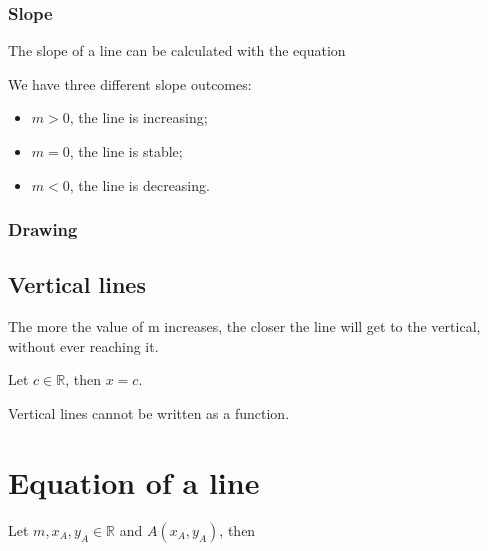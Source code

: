 \documentclass{article}
\newcommand{\figbox}[1]{ 
    \begin{figure*}[ht!]        
        \begin{center}            
            \fbox{#1}        
        \end{center}    
    \end{figure*}
}
\begin{document}
\subsubsection{Slope}
The slope of a line can be calculated with the equation
\figbox{$m=\frac{y_B - y_A}{x_B - x_A} = \frac{\Delta y}{\Delta x}$}

We have three different slope outcomes:
\begin{itemize}
    \item $m>0$, the line is increasing;
    \item $m=0$, the line is stable;
    \item $m<0$, the line is decreasing. 
\end{itemize}

\newpage
\subsubsection{Drawing}
\begin{center}
\end{center}

\subsection{Vertical lines}
The more the value of m increases, the closer the line will get to the vertical,
without ever reaching it.

Let $c \in \mathbb{R}$, then $x=c$.

Vertical lines cannot be written as a function.

\section{Equation of a line}
Let $m,x_A,y_A \in \mathbb{R}$ and $A(x_A, y_A)$, then
\figbox{$y-y_A=m(x-x_A)$}
\end{document}
